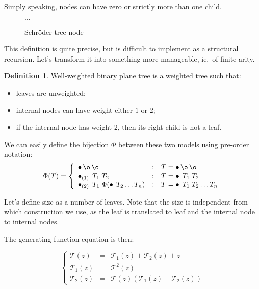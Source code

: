 \documentclass[final]{article}
\theoremstyle{definition}
\newtheorem{definition}{Definition}[subsection]
\theoremstyle{remark}
\newcommand{\gf}[1]{\ensuremath{\mathcal{#1}}}
\newcommand{\weighted}[1]{\ensuremath{_{(#1)}}}
\DeclareMathOperator{\n}{\bullet}
\DeclareMathOperator{\no}{\o}
\begin{document}
Simply speaking, nodes can have zero or strictly more than one child.

\begin{figure}[h]
    \centering
    
    
    
    
    \(\ldots\)
    \caption{Schröder tree node}
    \label{fig:schroder_trees}
\end{figure}

This definition is quite precise, but is difficult to implement as a structural recursion. Let's transform it into something more manageable, ie.~of finite arity.

\begin{definition}
    Well-weighted binary plane tree is a weighted tree such that:
    \begin{itemize}
        \item leaves are unweighted;
        \item internal nodes can have weight either \(1\) or \(2\);
        \item if the internal node has weight 2, then its right child is not a leaf.
    \end{itemize}
\end{definition}

We can easily define the bijection \(\Phi\) between these two models using pre-order notation:
\[\Phi(T) = \left\{\begin{array}{lcl}
            \n \no \no &:& T = \n \no \no \\
            \n\weighted{1}\; T_1\; T_2 &:& T = \n\; T_1\; T_2\\
            \n\weighted{2}\; T_1\; \Phi(\n\; T_2 \ldots T_n) &:& T = \n\; T_1\; T_2 \ldots T_n
\end{array}\right.\]

Let's define size as a number of leaves. Note that the size is independent from which construction we use, as the leaf is translated to leaf and the internal node to internal nodes.

The generating function equation is then:

\[\left\{\begin{array}{rcl}
            \gf{T}(z) &=& \gf{T}_1(z) + \gf{T}_2(z) + z\\
            \gf{T}_1(z) &=& \gf{T}^2(z)\\
            \gf{T}_2(z) &=& \gf{T}(z)(\gf{T}_1(z) + \gf{T}_2(z))
\end{array}\right.\]
\end{document}
